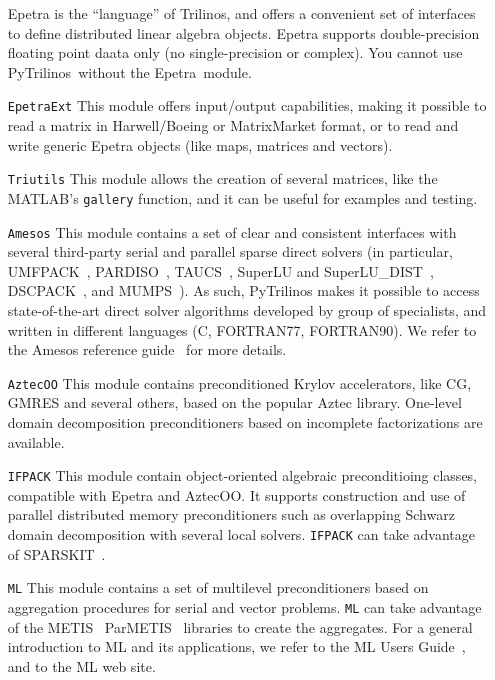 \documentclass[10pt,relax]{SANDreport}
\newcommand{\PyTrilinos}{{PyTrilinos}}
\newcommand{\epetra}{{Epetra}}
\begin{document}
\begin{itemize}
Epetra is the
``language'' of Trilinos, and offers a convenient set of interfaces to define
distributed linear algebra objects. Epetra supports double-precision floating
point daata only (no single-precision or complex). 
You cannot use \PyTrilinos\ without the \epetra\ module.
%
\item[\tt EpetraExt] This module offers input/output
capabilities, making it possible to read a matrix in Harwell/Boeing or
MatrixMarket format, or to read and write generic Epetra objects 
(like maps, matrices and vectors).
%
\item[\tt Triutils] This module allows the creation of several matrices, 
  like the MATLAB's {\tt gallery} function, and it can be useful for examples
  and testing.
%
\item[\tt Amesos] This module contains a set of clear and consistent
interfaces with several third-party serial and parallel sparse direct solvers
(in particular,
UMFPACK~\cite{umfpack-manual},
PARDISO~\cite{pardiso-manual},
TAUCS~\cite{taucs-manual},
SuperLU and SuperLU\_DIST~\cite{superlu-manual},
DSCPACK~\cite{dscpack-manual}, and 
MUMPS~\cite{mumps-manual}). As such, PyTrilinos makes it possible to access
state-of-the-art direct solver algorithms developed by group of specialists,
  and written in different languages (C, FORTRAN77, FORTRAN90).
We refer to the Amesos reference guide~\cite{Amesos-Reference-Guide} for more details.
%
\item[\tt AztecOO] This module contains preconditioned Krylov accelerators,
  like CG, GMRES and several others, based on the popular Aztec library.
  One-level domain decomposition preconditioners based on incomplete
  factorizations are available.
%
\item[\tt IFPACK] This module contain object-oriented algebraic preconditioing
classes, compatible with Epetra and AztecOO.
It supports construction and use of parallel distributed memory preconditioners
such as overlapping Schwarz domain decomposition with several local solvers.
{\tt IFPACK} can take advantage of SPARSKIT~\cite{sparskit}.
%
\item[\tt ML] This module contains a set of multilevel preconditioners based
on aggregation procedures for serial and vector problems. {\tt ML} can take
advantage of the 
METIS~\cite{metis}
ParMETIS~\cite{parmetis} libraries to create the aggregates.
For a general introduction to ML and its applications, we refer to
the ML Users Guide~\cite{ml-guide}, and to the ML web site.
\end{itemize}
\end{document}
